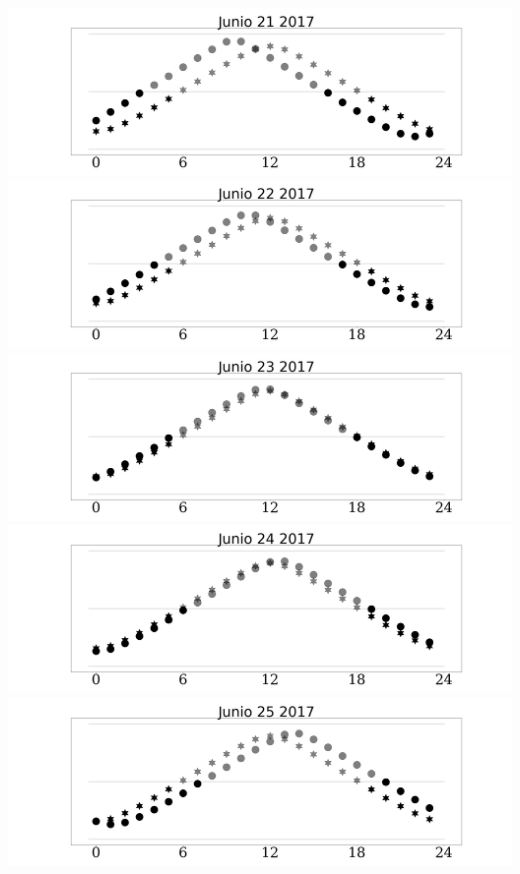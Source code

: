 \documentclass{report}
\begin{document}
\includegraphics[width=1.00\textwidth]{Junio_21_2017.png}\newpage
\includegraphics[width=1.00\textwidth]{Junio_22_2017.png}\newpage
\includegraphics[width=1.00\textwidth]{Junio_23_2017.png}\newpage
\includegraphics[width=1.00\textwidth]{Junio_24_2017.png}\newpage
\includegraphics[width=1.00\textwidth]{Junio_25_2017.png}\newpage
\end{document}
